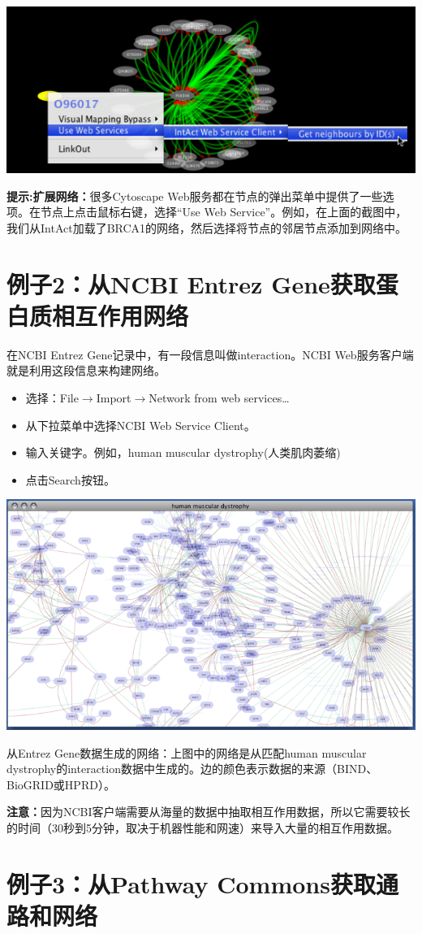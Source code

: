 \centerline{\includegraphics[width=.5\textwidth]{images/node_context2.png}}

{\bf 提示:扩展网络：}很多Cytoscape Web服务都在节点的弹出菜单中提供了一些选项。在节点上点击鼠标右键，选择``Use Web Service''。例如，在上面的截图中，我们从IntAct加载了BRCA1的网络，然后选择将节点的邻居节点添加到网络中。


\section{例子2：从NCBI Entrez Gene获取蛋白质相互作用网络}
在NCBI Entrez Gene记录中，有一段信息叫做interaction。NCBI Web服务客户端就是利用这段信息来构建网络。
\begin{itemize}
\item 选择：File$\rightarrow$Import$\rightarrow$Network from web services\ldots
\item 从下拉菜单中选择NCBI Web Service Client。
\item 输入关键字。例如，human muscular dystrophy(人类肌肉萎缩)
\item 点击Search按钮。
\end{itemize}

\centerline{\includegraphics[width=.7\textwidth]{images/entrez_import.png}}

从Entrez Gene数据生成的网络：上图中的网络是从匹配human muscular dystrophy的interaction数据中生成的。边的颜色表示数据的来源（BIND、BioGRID或HPRD）。

{\bf 注意：}因为NCBI客户端需要从海量的数据中抽取相互作用数据，所以它需要较长的时间（30秒到5分钟，取决于机器性能和网速）来导入大量的相互作用数据。


\section{例子3：从Pathway Commons获取通路和网络}



